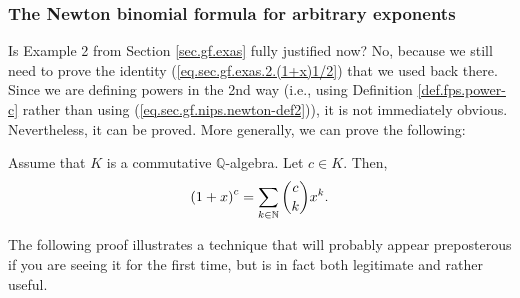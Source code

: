 \subsubsection{The Newton binomial formula for arbitrary exponents}

Is Example 2 from Section \ref{sec.gf.exas} fully justified now? No, because
we still need to prove the identity (\ref{eq.sec.gf.exas.2.(1+x)1/2}) that we
used back there. Since we are defining powers in the 2nd way (i.e., using
Definition \ref{def.fps.power-c} rather than using
(\ref{eq.sec.gf.nips.newton-def2})), it is not immediately obvious.
Nevertheless, it can be proved. More generally, we can prove the following:

\begin{theorem}
\label{thm.fps.gen-newton}Assume that $K$
is a commutative $\mathbb{Q}$-algebra. Let $c\in K$. Then,%
\[
\left(  1+x\right)  ^{c}=\sum_{k\in\mathbb{N}}\dbinom{c}{k}x^{k}.
\]

\end{theorem}

The following proof illustrates a technique that will probably appear
preposterous if you are seeing it for the first time, but is in fact both
legitimate and rather useful.

